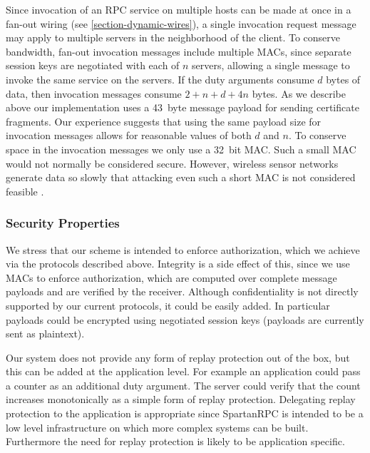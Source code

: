Since invocation of an RPC service on multiple hosts can be made at
once in a fan-out wiring (see \autoref{section-dynamic-wires}), a
single invocation request message may apply to multiple servers in the
neighborhood of the client. To conserve bandwidth, fan-out invocation
messages include multiple MACs, since separate session keys are
negotiated with each of $n$ servers, allowing a single message to
invoke the same service on the servers. If the duty arguments consume
$d$ bytes of data, then invocation messages consume $2 + n + d + 4n$
bytes. 
As we describe above our implementation uses a 43~byte message payload
for sending certificate fragments. Our experience suggests that using
the same payload size for invocation messages allows for reasonable
values of both $d$ and $n$.
To conserve space in the invocation messages we only use a 32~bit MAC.
Such a small MAC would not normally be considered secure. However,
wireless sensor networks generate data so slowly that attacking even
such a short MAC is not considered feasible
\cite{karlog-tinysec-2004,luk-minisec-2007}.


\subsubsection{Security Properties}
\label{section-security-properties}

We stress that our scheme is intended to enforce authorization, which we
achieve via the protocols described above. Integrity is a side effect of
this, since we use MACs to enforce authorization, which are computed
over complete message payloads and are verified by the receiver.
Although confidentiality is not directly supported by our current
protocols, it could be easily added. In particular payloads could be
encrypted using negotiated session keys (payloads are currently sent as
plaintext).

Our system does not provide any form of replay protection out of the
box, but this can be added at the application level. For example an
application could pass a counter as an additional duty argument. The
server could verify that the count increases monotonically as a simple
form of replay protection. Delegating replay protection to the
application is appropriate since SpartanRPC is intended to be a low
level infrastructure on which more complex systems can be
built. Furthermore the need for replay protection is likely to be
application specific.

